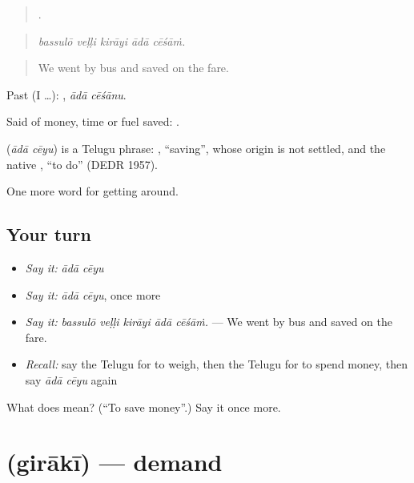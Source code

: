 \begin{quote}
    .
\end{quote}

\begin{quote}
\emph{bassulō veḷḷi kirāyi ādā cēśāṁ.}
\end{quote}

\begin{quote}
We went by bus and saved on the fare.
\end{quote}

Past (I …):  , \emph{ādā cēśānu}.

Said of money, time or fuel saved:   .

\begin{cousinweb}
\textbf{ } (\emph{ādā cēyu}) is a Telugu phrase: , \textquotedblleft{}saving\textquotedblright{}, whose origin is not settled, and the native , \textquotedblleft{}to do\textquotedblright{} (DEDR 1957).
\end{cousinweb}

\begin{grammarlens}[title={What you've built}]
One more word for getting around.
\end{grammarlens}

\subsection*{Your turn}
\begin{itemize}
\raggedright
  \item \emph{Say it:} \emph{ādā cēyu}
  \item \emph{Say it:} \emph{ādā cēyu}, once more
  \item \emph{Say it:} \emph{bassulō veḷḷi kirāyi ādā cēśāṁ.} — We went by bus and saved on the fare.
  \item \emph{Recall:} say the Telugu for to weigh, then the Telugu for to spend money, then say \emph{ādā cēyu} again
\end{itemize}

\begin{tcolorbox}[breakable,colback=teal!4,colframe=teal!35!black,title={Before you move on}]
What does   mean? (\textquotedblleft{}To save money\textquotedblright{}.) Say it once more.
\end{tcolorbox}
\section[\texorpdfstring{\te{గిరాకీ} (girākī)}{గిరాకీ (girākī)}]{ (girākī) — demand}

